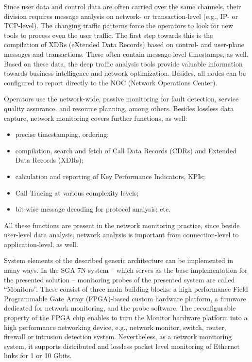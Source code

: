 \documentclass[journal]{IEEEtran}
\begin{document}
Since user data and control data are often carried over the same channels, their division requires message analysis on network- or transaction-level (e.g., IP- or TCP-level). The changing traffic patterns force the operators to look for new tools to process even the user traffic. The first step towards this is the compilation of XDRs (eXtended Data Records) based on control- and user-plane messages and transactions. These often contain message-level timestamps, as well. Based on these data, the deep traffic analysis tools provide valuable information towards business-intelligence and network optimization. Besides, all nodes can be configured to report directly to the NOC (Network Operations Center).

Operators use the network-wide, passive monitoring for fault detection, service quality assurance, and resource planning, among others. Besides lossless data capture, network monitoring covers further functions, as well:
\begin{itemize}
\renewcommand\labelitemi{--}
\item precise timestamping, ordering;
\item compilation, search and fetch of Call Data Records (CDRs) and Extended Data Records (XDRs);
\item calculation and reporting of Key Performance Indicators, KPIs;
\item Call Tracing at various complexity levels;
\item bit-wise message decoding for protocol analysis; etc. 
\end{itemize}

All these functions are present in the network monitoring practice, since beside user-level data analysis, network analysis is important from connection-level to application-level, as well.

System elements of the described generic architecture can be implemented in many ways. In the SGA-7N system -- which serves as the base implementation for the presented solution --  monitoring probes of the presented system are called ``Monitors''. These consist of three main building blocks: a high performance Field Programmable Gate Array (FPGA)-based custom hardware platform, a firmware dedicated for network monitoring, and the probe software. The reconfigurable property of the FPGA chip enables to turn the Monitor hardware platform into a high performance networking device, e.g., network monitor, switch, router, firewall or intrusion detection system. Nevertheless, as a network monitoring system, it supports distributed and lossless packet level monitoring of Ethernet links for 1 or 10 Gbit\/s.
\end{document}
